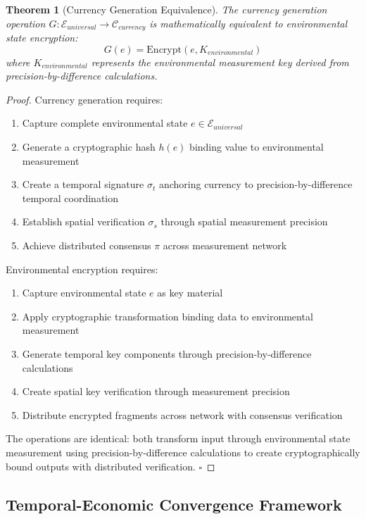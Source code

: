 \documentclass[12pt,a4paper]{article}
\newtheorem{theorem}{Theorem}
\begin{document}
\begin{theorem}[Currency Generation Equivalence]
The currency generation operation $G: \mathcal{E}_{universal} \to \mathcal{C}_{currency}$ is mathematically equivalent to environmental state encryption:
\begin{equation}
G(e) = \text{Encrypt}(e, K_{environmental})
\end{equation}
where $K_{environmental}$ represents the environmental measurement key derived from precision-by-difference calculations.
\end{theorem}

\begin{proof}
Currency generation requires:
\begin{enumerate}
\item Capture complete environmental state $e \in \mathcal{E}_{universal}$
\item Generate a cryptographic hash $h(e)$ binding value to environmental measurement
\item Create a temporal signature $\sigma_t$ anchoring currency to precision-by-difference temporal coordination
\item Establish spatial verification $\sigma_s$ through spatial measurement precision
\item Achieve distributed consensus $\pi$ across measurement network
\end{enumerate}

Environmental encryption requires:
\begin{enumerate}
\item Capture environmental state $e$ as key material
\item Apply cryptographic transformation binding data to environmental measurement
\item Generate temporal key components through precision-by-difference calculations
\item Create spatial key verification through measurement precision
\item Distribute encrypted fragments across network with consensus verification
\end{enumerate}

The operations are identical: both transform input through environmental state measurement using precision-by-difference calculations to create cryptographically bound outputs with distributed verification. $\square$
\end{proof}

\subsection{Temporal-Economic Convergence Framework}
\end{document}
